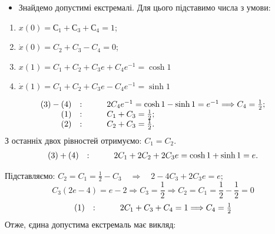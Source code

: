 \documentclass{beamer}
\begin{document}
\begin{frame}
\begin{itemize}
  \item Знайдемо допустимі екстремалі. Для цього підставимо числа з умови:
\end{itemize}
\begin{enumerate}
  \item $x(0) = С_1 + С_3 + С_4= 1$;
  \item $\dot{x} (0) = C_2 + C_3 - C_4 = 0$;
  \item $x(1) = C_1 + C_2 + C_3 e + C_4 e^{-1} = \cosh{1} $
  \item $\dot{x}(1) = C_1 + C_2 + C_3 e - C_4 e^{-1} = \sinh{1} $
\end{enumerate} \par
$$
\begin{array}{r c l}
   (3) - (4) & : \qquad & 2C_4 e^{-1} = \cosh 1 - \sinh{1} = e^{-1} \Longrightarrow C_4 = \frac{1}{2};\\
   (1)  & : \qquad & C_1 + C_3 = \frac{1}{2} ;\\
    (2)& : \qquad & C_2 + C_3 = \frac{1}{2}  .\\
\end{array}
$$
З останніх двох рівностей отримуємо: $C_1 = C_2$.
$$
\begin{array}{r c l}
   (3) + (4) & : \qquad & 2 C_1 + 2C_2 + 2 C_3 e = \cosh 1 + \sinh 1  = e.\\
\end{array}
$$
\end{frame}
\begin{frame}
  Підставляємо: $C_2 = C_1 = \frac{1}{2} - C_3  \quad \Longrightarrow \quad
  2 - 4 C_3 + 2 C_3 e = e;
  $
  $$
  C_3 (2 e - 4) = e -2 \Longrightarrow C_3 = \frac{1}{2} \Longrightarrow C_2 = C_1 = \frac{1}{2} - \frac{1}{2} = 0
  $$
  $$
  \begin{array}{r c l}
     (1) & : \qquad & 2 C_1 + C_3 + C_4= 1 \Longrightarrow C_4 = \frac{1}{2} \\
  \end{array}
  $$
  Отже, \alert{єдина допустима екстремаль має викляд:}
\begin{center}
\end{center}
\end{frame}
\end{document}
